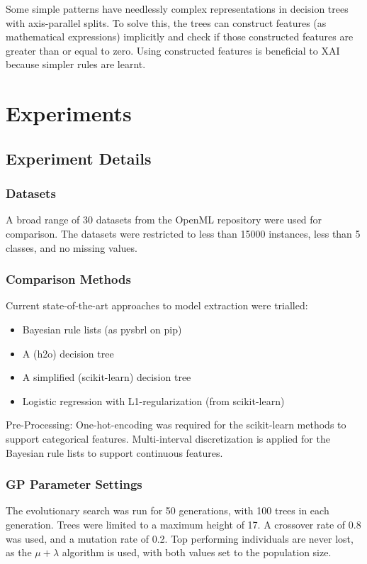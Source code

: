 Some simple patterns have needlessly complex representations in decision trees with axis-parallel splits. To solve this, the trees can construct features (as mathematical expressions) implicitly and check if those constructed features are greater than or equal to zero. Using constructed features is beneficial to XAI because simpler rules are learnt.
\section{Experiments}
\subsection{Experiment Details}
\subsubsection{Datasets}
A broad range of 30 datasets from the OpenML repository \cite{Van:openml} were used for comparison. The datasets were restricted to less than 15000 instances, less than 5 classes, and no missing values.
\subsubsection{Comparison Methods}
Current state-of-the-art approaches to model extraction were trialled:
\begin{itemize}
\item Bayesian rule lists (as pysbrl on pip)
\item A (h2o) decision tree
\item A simplified (scikit-learn) decision tree
\item Logistic regression with L1-regularization (from scikit-learn)
\end{itemize}
Pre-Processing: One-hot-encoding was required for the scikit-learn \cite{Pedregosa:sickit} methods to support categorical features. Multi-interval discretization is applied for the Bayesian rule lists to support continuous features.
\subsubsection{GP Parameter Settings}
The evolutionary search was run for 50 generations, with 100 trees in each generation. Trees were limited to a maximum height of 17. A crossover rate of 0.8 was used, and a mutation rate of 0.2. Top performing individuals are never lost, as the $\mu + \lambda$ algorithm \cite{Beyer:evo_strat} is used, with both values set to the population size.
